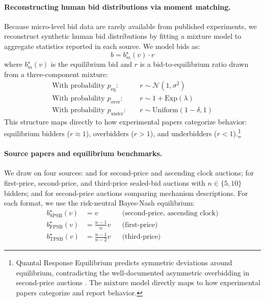 \documentclass[acmsmall,screen,review]{acmart}
\begin{document}
\paragraph{Reconstructing human bid distributions via moment matching.}
Because micro-level bid data are rarely available from published experiments, we reconstruct synthetic human bid distributions by fitting a mixture model to aggregate statistics
reported in each source. We model bids as:
\[
b = b^\star_m(v) \cdot r
\]
where $b^\star_m(v)$ is the equilibrium bid and $r$ is a bid-to-equilibrium ratio drawn from a three-component mixture:
\begin{align*}
\text{With probability } p_{\text{eq}}: \quad & r \sim \mathcal{N}(1, \sigma^2) \\
\text{With probability } p_{\text{over}}: \quad & r \sim 1 + \text{Exp}(\lambda) \\
\text{With probability } p_{\text{under}}: \quad & r \sim \text{Uniform}(1-\delta, 1)
\end{align*}
This structure maps directly to how experimental papers categorize behavior: equilibrium bidders ($r \approx 1$), overbidders ($r > 1$), and underbidders ($r < 1$).\footnote{Quantal Response Equilibrium predicts symmetric deviations around equilibrium, contradicting the well-documented asymmetric overbidding in second-price auctions \citep{kagel1993independent}. The mixture model directly maps to how experimental papers categorize and report behavior.}

\paragraph{Source papers and equilibrium benchmarks.}
We draw on four sources: \citet{li2017obviously} and \citet{breitmoser2022obviousness} for second-price and ascending clock auctions; \citet{kagel1993independent} for first-price,
second-price, and third-price sealed-bid auctions with $n \in \{5, 10\}$ bidders; and \citet{gonczarowski2023strategyproofness} for second-price auctions comparing mechanism
descriptions. For each format, we use the risk-neutral Bayes-Nash equilibrium:
\begin{align*}
b^\star_{\text{SPSB}}(v) &= v & &\text{(second-price, ascending clock)} \\
b^\star_{\text{FPSB}}(v) &= \tfrac{n-1}{n} v & &\text{(first-price)} \\
b^\star_{\text{TPSB}}(v) &= \tfrac{n-1}{n-2} v & &\text{(third-price)}
\end{align*}
\end{document}

